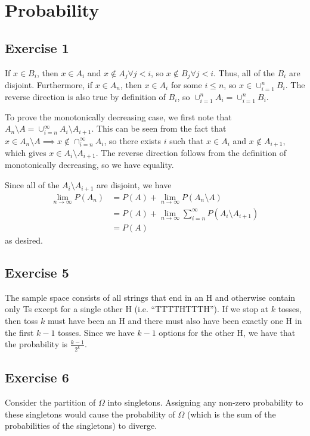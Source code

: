 \section{Probability}

\subsection{Exercise 1}
If $x \in B_i$, then $x \in A_i$ and $x \notin A_j \forall j < i$, so $x \notin B_j \forall j < i$.
Thus, all of the $B_i$ are disjoint. Furthermore, if $x \in A_n$, then 
$x \in A_i$ for some $i \leq n$, so $x \in \cup_{i = 1}^n B_i$. The reverse direction
is also true by definition of $B_i$, so $\cup_{i = 1}^n A_i = \cup_{i = 1}^n B_i$.

To prove the monotonically decreasing case, we first note that
$A_n \setminus A = \cup_{i = n}^\infty A_i \setminus A_{i + 1}$. This can be
seen from the fact that $x \in A_n \setminus A \implies x \notin \cap_{i = n}^\infty A_i$,
so there exists $i$ such that $x \in A_i$ and $x \notin A_{i + 1}$, which gives
$x \in A_i \setminus A_{i + 1}$. The reverse direction follows from the
definition of monotonically decreasing, so we have equality.

Since all of the $A_i \setminus A_{i + 1}$ are disjoint, we have
\begin{align*}
        \lim_{n \to \infty} P(A_n) &= P(A) + \lim_{n \to \infty} P(A_n \setminus A) \\
                                   &= P(A) + \lim_{n \to \infty} \sum_{i = n}^\infty P(A_i \setminus A_{i + 1}) \\
                                   &= P(A)
\end{align*}
as desired.

\subsection{Exercise 5}
The sample space consists of all strings that end in an H and otherwise contain only Ts
except for a single other H (i.e. ``TTTTHTTTH''). If we stop at $k$ tosses, then toss $k$
must have been an H and there must also have been exactly one H in the first $k - 1$ tosses.
Since we have $k - 1$ options for the other H, we have that the probability is
$\frac{k - 1}{2^k}$.

\subsection{Exercise 6}
Consider the partition of $\Omega$ into singletons. Assigning any non-zero probability to
these singletons would cause the probability of $\Omega$ (which is the sum of the probabilities
of the singletons) to diverge.

